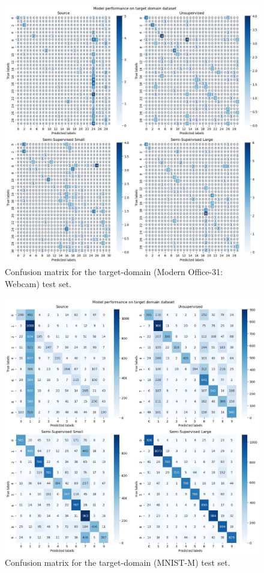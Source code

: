 \documentclass[12pt, a4paper]{article}
\begin{document}
	\begin{figure}
		\centering
		\includegraphics[width=12cm]{"office_cls_matrix.jpeg"}
		\caption{Confusion matrix for the target-domain (Modern Office-31: Webcam) test set.}
		\label{fig::office_confusion}
	\end{figure}
	
	\begin{figure}
		\centering
		\includegraphics[width=12cm]{"mnist_cls_matrix.jpeg"}
		\caption{Confusion matrix for the target-domain (MNIST-M) test set.}
		\label{fig::mnist_confusion}
	\end{figure}
	
\end{document}
